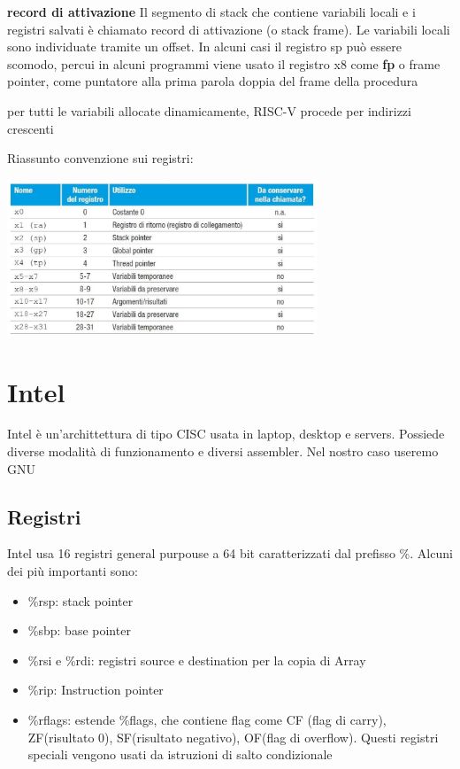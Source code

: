 \documentclass[12pt, a4paper]{article}
\begin{document}
\textbf{record di attivazione}
Il segmento di stack che contiene variabili locali e i registri salvati è chiamato record di attivazione
(o stack frame). Le variabili locali sono individuate tramite un offset. In alcuni casi il registro
sp può essere scomodo, percui in alcuni programmi viene usato il registro x8 come \textbf{fp} o frame pointer,
come puntatore alla prima parola doppia del frame della procedura

per tutti le variabili allocate dinamicamente, RISC-V procede per indirizzi crescenti

Riassunto convenzione sui registri:
\begin{center}
  \includegraphics[width=350px]{images/RISC-V_RegisterConvention.jpeg}
\end{center}




\newpage
\section{Intel}

Intel è un'archittettura di tipo CISC usata in laptop, desktop e servers. Possiede diverse modalità di
funzionamento e diversi assembler. Nel nostro caso useremo GNU

\subsection{Registri}
Intel usa 16 registri general purpouse a 64 bit caratterizzati dal prefisso \%. Alcuni dei più importanti
sono:
\begin{itemize}
  \item \%rsp: stack pointer
  \item \%sbp: base pointer
  \item \%rsi e \%rdi: registri source e destination per la copia di Array
  \item \%rip: Instruction pointer
  \item \%rflags: estende \%flags, che contiene flag come CF (flag di carry), ZF(risultato 0),
  SF(risultato negativo), OF(flag di overflow). Questi registri speciali vengono usati da
  istruzioni di salto condizionale
\end{itemize}
\end{document}
